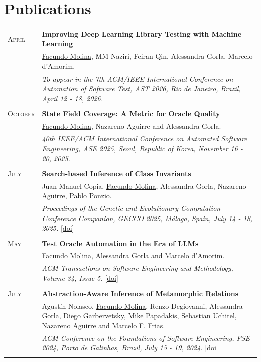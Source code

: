 \documentclass[a4paper,10pt]{article} %
\begin{document}
\section{Publications}
\begin{longtable}{>{\raggedleft\arraybackslash}p{} p{}}

\textsc{April}  & \textbf{Improving Deep Learning Library Testing with Machine Learning} \\
        2026 & \underline{Facundo Molina}, MM Naziri, Feiran Qin, Alessandra Gorla, Marcelo d'Amorim. \\
        & \textit{To appear in the 7th ACM/IEEE International Conference on Automation of Software Test, AST 2026, Rio de Janeiro, Brazil, April 12 - 18, 2026.} \\ & \\

\textsc{October}  & \textbf{State Field Coverage: A Metric for Oracle Quality} \\
        2025 & \underline{Facundo Molina}, Nazareno Aguirre and Alessandra Gorla. \\
        & \textit{40th IEEE/ACM International Conference on Automated Software Engineering, ASE 2025, Seoul, Republic of Korea, November 16 - 20, 2025.} \\ & \\

\textsc{July}  & \textbf{Search-based Inference of Class Invariants} \\
        2025 & Juan Manuel Copia, \underline{Facundo Molina}, Alessandra Gorla, Nazareno Aguirre, Pablo Ponzio. \\
        & \textit{Proceedings of the Genetic and Evolutionary Computation Conference Companion, GECCO 2025, Málaga, Spain, July 14 - 18, 2025.} \href{https://doi.org/10.1145/3715107}{[doi]} \\ & \\

\textsc{May}  & \textbf{Test Oracle Automation in the Era of LLMs} \\
        2025 & \underline{Facundo Molina}, Alessandra Gorla and Marcelo d'Amorim. \\
        & \textit{ACM Transactions on Software Engineering and Methodology, Volume 34, Issue 5.} \href{https://doi.org/10.1145/3715107}{[doi]} \\ & \\

\textsc{July}  & \textbf{Abstraction-Aware Inference of Metamorphic Relations} \\
        2024 & Agustín Nolasco, \underline{Facundo Molina}, Renzo Degiovanni, Alessandra Gorla, Diego Garbervetsky, Mike Papadakis, Sebastian Uchitel, Nazareno Aguirre and Marcelo F. Frias. \\
        & \textit{ACM Conference on the Foundations of Software Engineering, FSE 2024, Porto de Galinhas, Brazil, July 15 - 19, 2024.} \href{https://dl.acm.org/doi/10.1145/3643747}{[doi]} \\ & \\


\end{longtable}
\end{document}
